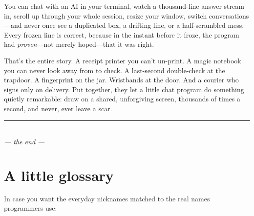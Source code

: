 \documentclass[11pt,twoside]{book}
\begin{document}
\begin{insight}
You can chat with an AI in your terminal, watch a thousand-line answer stream
in, scroll up through your whole session, resize your window, switch
conversations---and never once see a duplicated box, a drifting line, or a
half-scrambled mess. Every frozen line is correct, because in the instant
before it froze, the program had \emph{proven}---not merely hoped---that it was
right.
\end{insight}

That's the entire story. A receipt printer you can't un-print. A magic notebook
you can never look away from to check. A last-second double-check at the
trapdoor. A fingerprint on the jar. Wristbands at the door. And a courier who
signs only on delivery. Put together, they let a little chat program do
something quietly remarkable: draw on a shared, unforgiving screen, thousands of
times a second, and never, ever leave a scar.

\vspace{1cm}
\begin{center}
{\sffamily\color{rulegray}\rule{0.3\linewidth}{0.5pt}}\\[6pt]
{\itshape\color{accent} --- the end ---}
\end{center}

\backmatter
\chapter*{A little glossary}

In case you want the everyday nicknames matched to the real names
programmers use:
\end{document}
